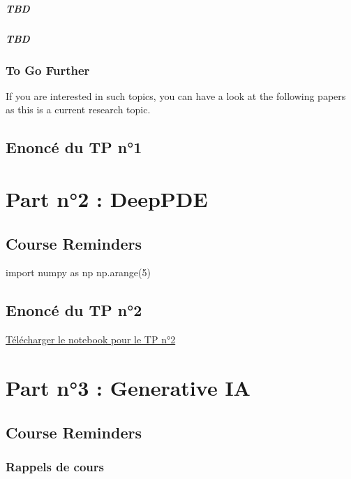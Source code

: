 \documentclass[
  10,
  letterpaper,
  DIV=11,
  numbers=noendperiod]{scrreport}
\theoremstyle{plain}
\theoremstyle{definition}
\theoremstyle{definition}
\theoremstyle{remark}
\begin{document}
\subsubsection{TBD}\label{tbd-1}

\subsubsection{TBD}\label{tbd-2}

\section{To Go Further}\label{to-go-further}

If you are interested in such topics, you can have a look at the
following papers as this is a current research topic.

\chapter{Enoncé du TP n°1}\label{enoncuxe9-du-tp-n1}

\part{Part n°2 : DeepPDE}

\chapter{Course Reminders}\label{course-reminders-1}

import numpy as np np.arange(5)

\chapter{Enoncé du TP n°2}\label{enoncuxe9-du-tp-n2}

\href{ProjetXVA.ipynb}{Télécharger le notebook pour le TP n°2}

\part{Part n°3 : Generative IA}

\chapter{Course Reminders}\label{course-reminders-2}

\section{Rappels de cours}\label{rappels-de-cours}
\end{document}
